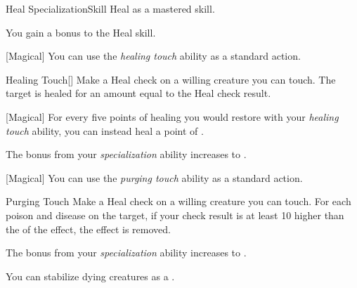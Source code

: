     \begin{feat}{Heal Specialization}{Skill}
        \featpre Heal as a mastered skill.

         You gain a  bonus to the Heal skill.

        [Magical] You can use the \textit{healing touch} ability as a standard action.
        \begin{freeability}{Healing Touch}[]
            Make a Heal check on a willing creature you can touch.
            The target is healed for an amount equal to the Heal check result.
        \end{freeability}

        [Magical] For every five points of healing you would restore with your \textit{healing touch} ability, you can instead heal a point of .

         The bonus from your \textit{specialization} ability increases to .

        [Magical] You can use the \textit{purging touch} ability as a standard action.
        \begin{freeability}{Purging Touch}
            Make a Heal check on a willing creature you can touch.
            For each poison and disease on the target, if your check result is at least 10 higher than the  of the effect, the effect is removed.
        \end{freeability}

         The bonus from your \textit{specialization} ability increases to .

         You can stabilize dying creatures as a .
    \end{feat}

